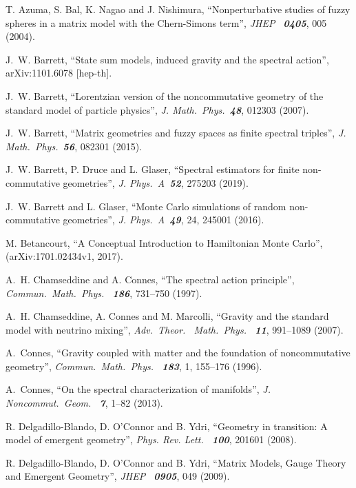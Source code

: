 \documentclass[12pt,a4paper]{article}
\begin{document}
\begin{thebibliography}{99} %

T. Azuma, S. Bal, K. Nagao and J. Nishimura,
``Nonperturbative studies of fuzzy spheres in a matrix model with the Chern-Simons term'',
{\it JHEP \ \bf 0405}, 005 (2004).

J.~W. Barrett,
``State sum models, induced gravity and the spectral action'',
arXiv:1101.6078 [hep-th].

J.~W. Barrett,
``Lorentzian version of the noncommutative geometry of the standard model of particle physics'',
{\it J. Math.\ Phys.\ \bf 48}, 012303 (2007).

J.~W. Barrett,
``Matrix geometries and fuzzy spaces as finite spectral triples'',
{\it J. Math.\ Phys.\ \bf 56}, 082301 (2015).

J.~W. Barrett, P. Druce and L. Glaser,
``Spectral estimators for finite non-commutative geometries'',
{\it J. Phys.\ A\ \bf 52}, 275203 (2019).

J.~W. Barrett and L. Glaser,
``Monte Carlo simulations of random non-commutative geometries'',
{\it J. Phys.\ A\ \bf 49}, 24, 245001 (2016).

M. Betancourt,
``A Conceptual Introduction to Hamiltonian Monte Carlo'',
(arXiv:1701.02434v1, 2017).

A.~H. Chamseddine and A. Connes,
``The spectral action principle'',
{\it Commun.\ Math.\ Phys. \ \bf 186}, 731--750 (1997).

A.~H. Chamseddine, A. Connes and M. Marcolli,
``Gravity and the standard model with neutrino mixing'',
{\it Adv.\ Theor. \ Math.\ Phys. \ \bf 11}, 991--1089 (2007).

A.~Connes,
``Gravity coupled with matter and the foundation of noncommutative geometry'',
{\it Commun.\ Math.\ Phys. \ \bf 183}, 1, 155--176 (1996).

A.~Connes,
``On the spectral characterization of manifolds'',
{\it J. Noncommut.\ Geom. \ \bf 7}, 1--82 (2013).

R. Delgadillo-Blando, D. O’Connor and B. Ydri,
``Geometry in transition: A model of emergent geometry'',
{\it Phys. Rev. Lett. \ \bf 100}, 201601 (2008).
 
R. Delgadillo-Blando, D. O’Connor and B. Ydri,
``Matrix Models, Gauge Theory and Emergent Geometry'',
{\it JHEP \ \bf 0905}, 049 (2009).


\end{thebibliography}
\end{document}
